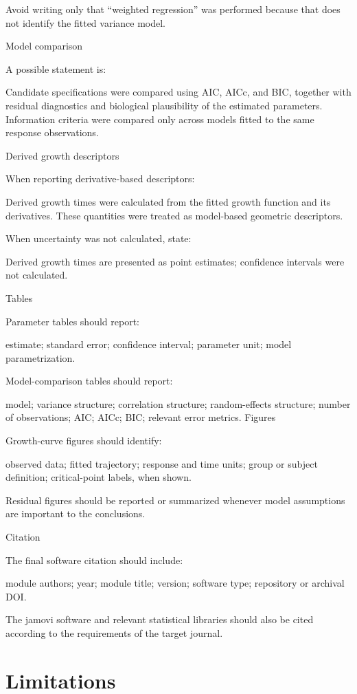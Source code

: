 \documentclass[
  english,
  letterpaper,
  DIV=11,
  numbers=noendperiod]{scrreprt}
\begin{document}
Avoid writing only that ``weighted regression'' was performed because
that does not identify the fitted variance model.

Model comparison

A possible statement is:

Candidate specifications were compared using AIC, AICc, and BIC,
together with residual diagnostics and biological plausibility of the
estimated parameters. Information criteria were compared only across
models fitted to the same response observations.

Derived growth descriptors

When reporting derivative-based descriptors:

Derived growth times were calculated from the fitted growth function and
its derivatives. These quantities were treated as model-based geometric
descriptors.

When uncertainty was not calculated, state:

Derived growth times are presented as point estimates; confidence
intervals were not calculated.

Tables

Parameter tables should report:

estimate; standard error; confidence interval; parameter unit; model
parametrization.

Model-comparison tables should report:

model; variance structure; correlation structure; random-effects
structure; number of observations; AIC; AICc; BIC; relevant error
metrics. Figures

Growth-curve figures should identify:

observed data; fitted trajectory; response and time units; group or
subject definition; critical-point labels, when shown.

Residual figures should be reported or summarized whenever model
assumptions are important to the conclusions.

Citation

The final software citation should include:

module authors; year; module title; version; software type; repository
or archival DOI.

The jamovi software and relevant statistical libraries should also be
cited according to the requirements of the target journal.

\chapter{Limitations}\label{limitations}
\end{document}
